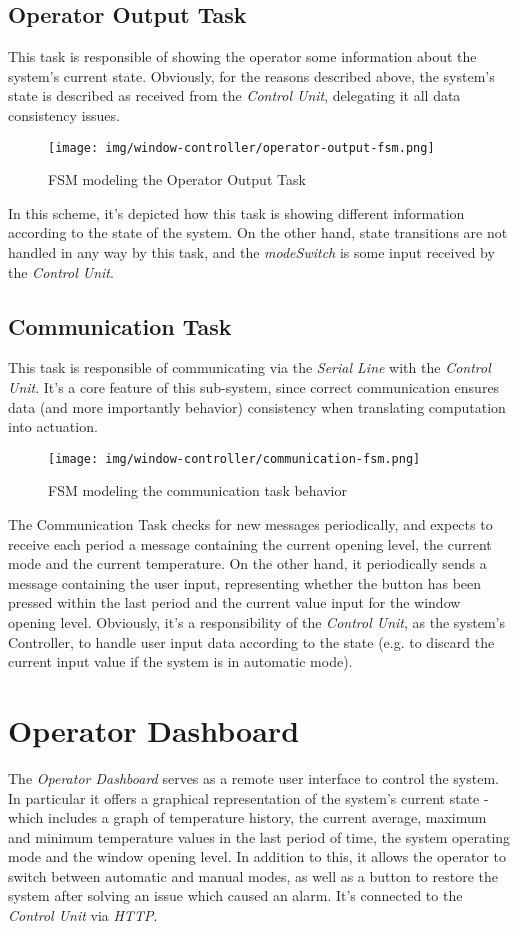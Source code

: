 \documentclass[a4paper,12pt]{report}
\begin{document}
		\subsection{Operator Output Task}
		This task is responsible of showing the operator some information about the system's current state. Obviously, for the reasons described above, the system's state is described as received from the \textit{Control Unit}, delegating it all data consistency issues.
		\begin{figure}[H]
			\centering{}
			\texttt{[image: img/window-controller/operator-output-fsm.png]}
			\caption{FSM modeling the Operator Output Task}
			\label{img:window-controller/operator-output-fsm}
		\end{figure}
		In this scheme, it's depicted how this task is showing different information according to the state of the system. On the other hand, state transitions are not handled in any way by this task, and the \textit{modeSwitch} is some input received by the \textit{Control Unit}.
		\subsection{Communication Task}
		This task is responsible of communicating via the \textit{Serial Line} with the \textit{Control Unit}. It's a core feature of this sub-system, since correct communication ensures data (and more importantly behavior) consistency when translating computation into actuation.
		\begin{figure}[H]
			\centering{}
			\texttt{[image: img/window-controller/communication-fsm.png]}
			\caption{FSM modeling the communication task behavior}
			\label{img:window-controller/communication-fsm}
		\end{figure}
		The Communication Task checks for new messages periodically, and expects to receive each period a message containing the current opening level, the current mode and the current temperature. On the other hand, it periodically sends a message containing the user input, representing whether the button has been pressed within the last period and the current value input for the window opening level. Obviously, it's a responsibility of the \textit{Control Unit}, as the system's Controller, to handle user input data according to the state (e.g. to discard the current input value if the system is in automatic mode).
	\section{Operator Dashboard}
	The \textit{Operator Dashboard} serves as a remote user interface to control the system. In particular it offers a graphical representation of the system's current state - which includes a graph of temperature history, the current average, maximum and minimum temperature values in the last period of time, the system operating mode and the window opening level. In addition to this, it allows the operator to switch between automatic and manual modes, as well as a button to restore the system after solving an issue which caused an alarm. It's connected to the \textit{Control Unit} via \textit{HTTP}.
\end{document}
